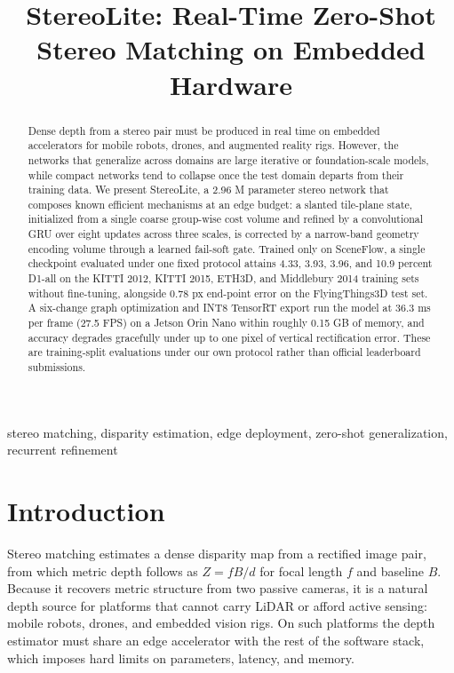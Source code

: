 \documentclass[conference]{IEEEtran}
\begin{document}
\title{StereoLite: Real-Time Zero-Shot Stereo Matching on Embedded Hardware}

\author{
}

\maketitle

\begin{abstract}
Dense depth from a stereo pair must be produced in real time on embedded accelerators for mobile robots, drones, and augmented reality rigs. However, the networks that generalize across domains are large iterative or foundation-scale models, while compact networks tend to collapse once the test domain departs from their training data. We present StereoLite, a 2.96 M parameter stereo network that composes known efficient mechanisms at an edge budget: a slanted tile-plane state, initialized from a single coarse group-wise cost volume and refined by a convolutional GRU over eight updates across three scales, is corrected by a narrow-band geometry encoding volume through a learned fail-soft gate. Trained only on SceneFlow, a single checkpoint evaluated under one fixed protocol attains 4.33, 3.93, 3.96, and 10.9 percent D1-all on the KITTI 2012, KITTI 2015, ETH3D, and Middlebury 2014 training sets without fine-tuning, alongside 0.78 px end-point error on the FlyingThings3D test set. A six-change graph optimization and INT8 TensorRT export run the model at 36.3 ms per frame (27.5 FPS) on a Jetson Orin Nano within roughly 0.15 GB of memory, and accuracy degrades gracefully under up to one pixel of vertical rectification error. These are training-split evaluations under our own protocol rather than official leaderboard submissions.
\end{abstract}

\begin{IEEEkeywords}
stereo matching, disparity estimation, edge deployment, zero-shot generalization, recurrent refinement
\end{IEEEkeywords}

\section{Introduction}
\label{sec:intro}
Stereo matching estimates a dense disparity map from a rectified image pair, from which metric depth follows as $Z = fB/d$ for focal length $f$ and baseline $B$. Because it recovers metric structure from two passive cameras, it is a natural depth source for platforms that cannot carry LiDAR or afford active sensing: mobile robots, drones, and embedded vision rigs. On such platforms the depth estimator must share an edge accelerator with the rest of the software stack, which imposes hard limits on parameters, latency, and memory.
\end{document}
